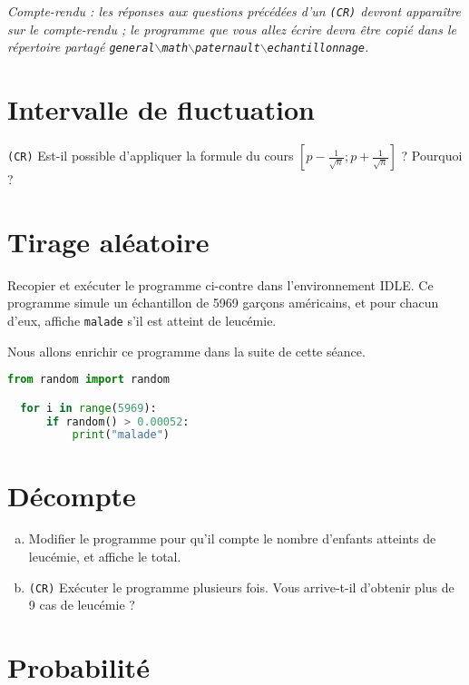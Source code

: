 \documentclass[12pt]{article}
\newcommand\CR{\texttt{(CR)}}
\begin{document}
\emph{Compte-rendu : les réponses aux questions précédées d'un \CR{} devront apparaître sur le compte-rendu ; le programme que vous allez écrire devra être copié dans le répertoire partagé \texttt{general$\backslash{}$math$\backslash{}$paternault$\backslash{}$echantillonnage}.}
\section{Intervalle de fluctuation}

\CR{} Est-il possible d'appliquer la formule du cours $\left[p-\frac{1}{\sqrt{n}}; p+\frac{1}{\sqrt{n}}\right]$ ? Pourquoi ?

\section{Tirage aléatoire}

\begin{multicols}{2}

  Recopier et exécuter le programme ci-contre dans l'environnement IDLE. Ce programme simule un échantillon de 5969 garçons américains, et pour chacun d'eux, affiche \texttt{malade} s'il est atteint de leucémie.

  Nous allons enrichir ce programme dans la suite de cette séance.

  \columnbreak

  \begin{lstlisting}[language=python,frame=single]
  from random import random

  for i in range(5969):
      if random() > 0.00052:
          print("malade")
  \end{lstlisting}
\end{multicols}

\section{Décompte}

\begin{enumerate}[(a)]
  \item Modifier le programme pour qu'il compte le nombre d'enfants atteints de leucémie, et affiche le total.
  \item \CR{} Exécuter le programme plusieurs fois. Vous arrive-t-il d'obtenir plus de 9 cas de leucémie ?
\end{enumerate}

\section{Probabilité}
\end{document}
